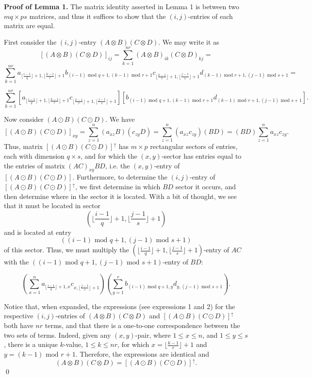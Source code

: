 \documentclass [12pt]{article}
\theoremstyle{definition}
\begin{document}
\textbf{Proof of Lemma 1.} The matrix identity asserted in Lemma 1 is between two $mq\times ps$ matrices, and thus it suffices to show that the $(i,j)$-entries of each matrix
are equal.

First consider the $(i,j)$-entry $(A\otimes B)(C\otimes D)$. We may write it as 
\[[(A\otimes B)(C\otimes D)]_{ij} = \sum_{k=1}^{nr} (A\otimes B)_{ik} (C\otimes D)_{kj} = \]
\[\sum_{k=1}^{nr} a_{\lfloor \frac{i-1}{q}\rfloor + 1, \lfloor \frac{k-1}{r}\rfloor + 1}b_{(i-1)\mbox{ mod } q + 1,(k-1)\mbox{ mod } r + 1}
c_{\lfloor \frac{k-1}{r}\rfloor + 1,\lfloor \frac{j-1}{s}\rfloor + 1}d_{(k-1)\mbox{ mod } r + 1,(j-1)\mbox{ mod } s + 1}=\]

\begin{equation}
\label{eq1}
\sum_{k=1}^{nr} [a_{\lfloor \frac{i-1}{q}\rfloor + 1, \lfloor \frac{k-1}{r}\rfloor + 1}c_{\lfloor \frac{k-1}{r}\rfloor + 1,\lfloor \frac{j-1}{s}\rfloor + 1}]
[b_{(i-1)\mbox{ mod } q + 1,(k-1)\mbox{ mod } r + 1}d_{(k-1)\mbox{ mod } r + 1,(j-1)\mbox{ mod } s + 1}].
\end{equation}

Now consider $(A\odot B)(C\odot D)$. We have
\[[(A\odot B)(C\odot D)]_{xy} = \sum_{z=1}^n (a_{xz}B)(c_{zy}D) = \sum_{z=1}^n(a_{xz}c_{zy})(BD) = (BD)\sum_{z=1}^na_{xz}c_{zy}.\]
Thus, matrix $[(A\odot B)(C\odot D)]^{\uparrow}$ has $m\times p$ rectangular sectors of entries, each with dimension $q\times s$, and for which the $(x,y)$-sector has entries equal to the entries of matrix $(AC)_{xy}BD$, i.e. the
$(x,y)$-entry of $[(A\odot B)(C\odot D)]$. Furthermore, to determine the $(i,j)$-entry of $[(A\odot B)(C\odot D)]^{\uparrow}$, we first determine in which $BD$ sector it occurs, and 
then determine where in the sector it is located. With a bit of thought, we see that it must be located in sector
\[(\lfloor \frac{i-1}{q}\rfloor + 1, \lfloor \frac{j-1}{s}\rfloor + 1)\]
and is located at entry
\[((i-1)\mbox{ mod } q + 1, (j-1)\mbox{ mod } s + 1)\]
of this sector. Thus, we must multiply the $(\lfloor \frac{i-1}{q}\rfloor + 1, \lfloor \frac{j-1}{s}\rfloor + 1)$-entry of $AC$ with the 
$((i-1)\mbox{ mod } q + 1, (j-1)\mbox{ mod } s + 1)$-entry of $BD$:

\begin{equation}
\label{eq2}
\left(\sum_{x=1}^{n} a_{\lfloor \frac{i-1}{q}\rfloor + 1, x}c_{x,\lfloor \frac{j-1}{s}\rfloor + 1}\right)\left(\sum_{y=1}^r
b_{(i-1)\mbox{ mod } q + 1,y}d_{y,(j-1)\mbox{ mod } s + 1}\right).
\end{equation}

Notice that, when expanded, the expressions (see expressions 1 and 2) for the respective $(i,j)$-entries of $(A\otimes B)(C\otimes D)$ and $[(A\odot B)(C\odot D)]^{\uparrow}$ both
have $nr$ terms, and that there is a one-to-one correspondence between the two sets of terms. Indeed, given any $(x,y)$-pair, where $1\leq x\leq n$, and $1\leq y\leq s$, there
is a unique $k$-value, $1\leq k\leq nr$, for which $x = \lfloor \frac{k-1}{r}\rfloor + 1$ and $y=(k-1)\mbox{ mod } r + 1$. Therefore, the expressions are identical and 
\[(A\otimes B)(C\otimes D) = [(A\odot B)(C\odot D)]^{\uparrow}.\]
\qed
\end{document}
